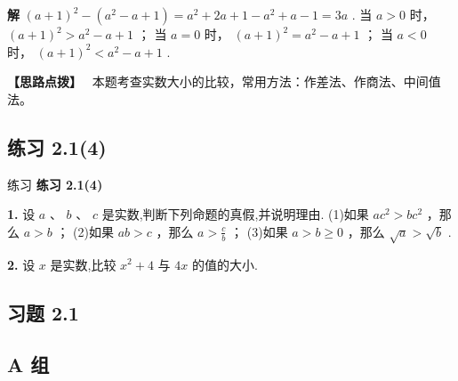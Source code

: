 \documentclass[a4paper,10pt,oneside,fontset=none]{ctexbook}
\renewcommand{\geq}{\geqslant}
\newenvironment{exercise}[1][]{\begin{exBox}{练习}{#1}}{\end{exBox}}
\numberwithin{equation}{chapter}
\newenvironment{solution}{\begin{solutionBox}}{\end{solutionBox}}
\newenvironment{hint}{\begin{hintBox}\textbf{【思路点拨】}~}{\end{hintBox}}
\begin{document}
\begin{solution}
\textbf{解}
${\left( a + 1\right) }^{2} - \left( {{a}^{2} - a + 1}\right)  = {a}^{2} + {2a} + 1 - {a}^{2} + a - 1 = {3a}$ .
当 $a > 0$ 时， ${\left( a + 1\right) }^{2} > {a}^{2} - a + 1$ ；
当 $a = 0$ 时， ${\left( a + 1\right) }^{2} = {a}^{2} - a + 1$ ；
当 $a < 0$ 时， ${\left( a + 1\right) }^{2} < {a}^{2} - a + 1$ .
\end{solution}

\begin{hint}
本题考查实数大小的比较，常用方法：作差法、作商法、中间值法。
\end{hint}

\subsection*{练习 2.1(4)}

\begin{exercise}
\textbf{练习 2.1(4)}\par\vspace{0.5em}
\textbf{1.} 设 $a\text{ 、 }b\text{ 、 }c$ 是实数,判断下列命题的真假,并说明理由. (1)如果 $a{c}^{2} > b{c}^{2}$ ，那么 $a > b$ ； (2)如果 ${ab} > c$ ，那么 $a > \frac{c}{b}$ ； (3)如果 $a > b \geq  0$ ，那么 $\sqrt{a} > \sqrt{b}$ .
\par\vspace{0.8em}
\textbf{2.} 设 $x$ 是实数,比较 ${x}^{2} + 4$ 与 ${4x}$ 的值的大小.
\end{exercise}

\subsection*{习题 2.1}

\subsection*{A 组}
\end{document}
